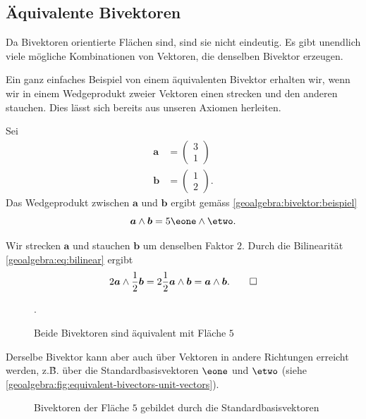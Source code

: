 \subsection{Äquivalente Bivektoren}
Da Bivektoren orientierte Flächen sind, sind sie nicht eindeutig. Es gibt unendlich viele mögliche Kombinationen von Vektoren,
die denselben Bivektor erzeugen.

Ein ganz einfaches Beispiel von einem äquivalenten Bivektor erhalten wir, wenn wir in einem Wedgeprodukt zweier Vektoren einen strecken
und den anderen stauchen. Dies lässt sich bereits aus unseren Axiomen herleiten.

{
\renewcommand{\a}{\boldsymbol{a}}
\renewcommand{\b}{\boldsymbol{b}}
\begin{beispiel}
Sei
  \begin{align*}
    \a &= \begin{pmatrix} 3 \\ 1 \end{pmatrix} \\
    \b &= \begin{pmatrix} 1 \\ 2 \end{pmatrix}.
  \end{align*}
Das Wedgeprodukt zwischen $\a$ und $\b$ ergibt gemäss
\eqref{geoalgebra:bivektor:beispiel}
  \begin{equation*}
    \a \wedge \b = 5 \eone \wedge \etwo.
  \end{equation*}

  Wir strecken $\a$ und stauchen $\b$ um denselben Faktor $2$. Durch die Bilinearität \eqref{geoalgebra:eq:bilinear} ergibt
  \begin{equation*}
    2 \a \wedge \frac{1}{2} \b = 2 \frac{1}{2} \a \wedge \b = \a \wedge \b. \qedhere
  \end{equation*}



\begin{figure}
  \begin{center}


  \end{center}
  \caption{Beide Bivektoren sind äquivalent mit Fläche $5$}\label{geoalgebra:fig:bivektor-als-flaeche}.
\end{figure}
\end{beispiel}

Derselbe Bivektor kann aber auch über Vektoren in andere Richtungen erreicht werden, z.\~B. über die Standardbasisvektoren $\eone$ und $\etwo$ (siehe \autoref{geoalgebra:fig:equivalent-bivectors-unit-vectors}).

\begin{figure}
\begin{center}


  \caption{Bivektoren der Fläche $5$ gebildet durch die Standardbasisvektoren}
  \label{geoalgebra:fig:equivalent-bivectors-unit-vectors}
\end{center}
\end{figure}

}


